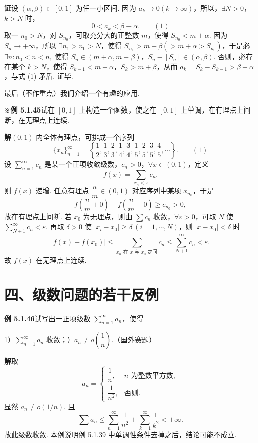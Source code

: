 \documentclass[UTF8,12pt,a4paper,fontset=fandol]{ctexart}
\begin{document}
\noindent\textbf{证}\quad 设 $(\alpha,\beta)\subset[0,1]$ 为任一小区间. 因为 $a_k\to0(k\to\infty)$，所以，$\exists N>0$，$k>N$ 时，
\[
  0<a_k<\beta-\alpha.
\qquad(1)
\]
取一 $n_0>N$，对 $S_{n_0}$，可取充分大的正整数 $m$，使得 $S_{n_0}<m+\alpha$. 因为 $S_n\to+\infty$，所以 $\exists n_1>n_0>N$，使得 $S_{n_1}>m+\beta(>m+\alpha>S_{n_0})$，于是必 $\exists n:n_0<n<n_1$ 使得 $S_n\in(m+\alpha,m+\beta)$，$S_n-[S_n]\in(\alpha,\beta)$. 否则，必存在某个 $k>N$，使得 $S_{k-1}<m+\alpha$，$S_k>m+\beta$，从而 $a_k=S_k-S_{k-1}>\beta-\alpha$，与式 (1) 矛盾. 证毕.

最后（不作重点）我们介绍一个有趣的应用.

\noindent\textbf{※例 5.1.45}\quad 试在 $[0,1]$ 上构造一个函数，使之在 $[0,1]$ 上单调，在有理点上间断，在无理点上连续.

\noindent\textbf{解}\quad $(0,1)$ 内全体有理点，可排成一个序列
\[
  \{x_n\}_{n=1}^{\infty}
  =\left\{\frac12,\frac13,\frac23,\frac14,\frac34,
  \frac15,\frac25,\frac35,\frac45,\cdots\right\}.
\qquad(1)
\]
设 $\displaystyle\sum_{n=1}^{\infty}c_n$ 是某一个正项收敛级数，$c_n>0$，$\forall x\in(0,1)$，定义
\[
  f(x)=\sum_{x_n<x}c_n.
\]
则 $f(x)$ 递增. 任意有理点 $\dfrac nm\in(0,1)$ 对应序列中某项 $x_{n_0}$，于是
\[
  f\left(\frac nm+0\right)-f\left(\frac nm-0\right)\ge c_{n_0}>0,
\]
故在有理点上间断. 若 $x_0$ 为无理点，则由 $\sum c_n$ 收敛，$\forall\varepsilon>0$，可取 $N$ 使 $\sum_{N+1}^{\infty}c_n<\varepsilon$. 再取 $\delta>0$ 使 $|x_i-x_0|\ge\delta\ (i=1,\cdots,N)$，则 $|x-x_0|<\delta$ 时
\[
  |f(x)-f(x_0)|
  \le\sum_{x_n\text{ 在 }x\text{ 与 }x_0\text{ 之间}}c_n
  \le\sum_{N+1}^{\infty}c_n<\varepsilon.
\]
故 $f(x)$ 在无理点上连续.

\section*{四、级数问题的若干反例}

\noindent\textbf{例 5.1.46}\quad 试写出一正项级数 $\displaystyle\sum_{n=1}^{\infty}a_n$，使得

1）$\displaystyle\sum_{n=1}^{\infty}a_n$ 收敛；）$a_n\ne o\left(\dfrac1n\right)$.（国外赛题）

\noindent\textbf{解}\quad 取
\[
  a_n=
  \begin{cases}
  \dfrac1n, & n\text{ 为整数平方数},\\[0.4em]
  \dfrac1{n^2}, & \text{否则}.
  \end{cases}
\]
显然 $a_n\ne o(1/n)$. 且
\[
  \sum a_n\le \sum_{n=1}^{\infty}\frac1{n^2}
  +\sum_{k=1}^{\infty}\frac1{k^2}<+\infty.
\]
故此级数收敛. 本例说明例 5.1.39 中单调性条件去掉之后，结论可能不成立.
\end{document}

